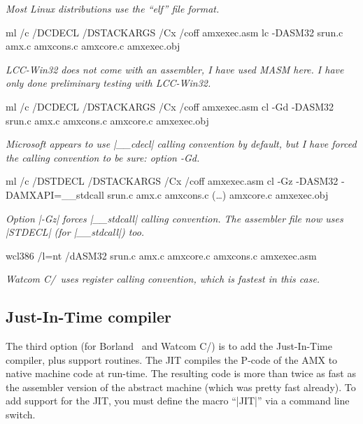         {\it Most Linux distributions use the ``elf'' file format.}

 \lbreak
        {\smalltt ml /c /DCDECL /DSTACKARGS /Cx /coff amxexec.asm} \lbreak
        {\smalltt lc -DASM32 srun.c amx.c amxcons.c amxcore.c amxexec.obj}

        {\it LCC-Win32 does not come with an assembler, I have used MASM here.
        I have only done preliminary testing with LCC-Win32.}

 \lbreak
        {\smalltt ml /c /DCDECL /DSTACKARGS /Cx /coff amxexec.asm} \lbreak
        {\smalltt cl -Gd -DASM32 srun.c amx.c amxcons.c amxcore.c amxexec.obj}

        {\it Microsoft appears to use |__cdecl| calling convention by default,
        but I have forced the calling convention to be sure: option -Gd.}

 \lbreak
        {\smalltt ml /c /DSTDECL /DSTACKARGS /Cx /coff amxexec.asm} \lbreak
        {\smalltt cl -Gz -DASM32 -DAMXAPI=__stdcall srun.c amx.c amxcons.c {\sevenit (\dots)}\lbreak{\sevenit (\dots)} amxcore.c amxexec.obj}

        {\it Option |-Gz| forces |__stdcall| calling convention. The assembler
        file now uses |STDECL| (for |__stdcall|) too.}

 \lbreak
        {\smalltt wcl386 /l=nt /dASM32 srun.c amx.c amxcore.c amxcons.c amxexec.asm}

        {\it Watcom C/\Cpp\ uses register calling convention, which is fastest
        in this case.}
\endlist

\subsection{Just-In-Time compiler}
The third option (for Borland \Cpp\ and Watcom C/\Cpp) is to add the Just-In-Time compiler, plus
support routines. The JIT compiles the P-code of the AMX to native machine
code at run-time. The resulting code is more than twice as fast as the
assembler version of the abstract machine (which was pretty fast already).
To add support for the JIT, you must define the macro ``|JIT|'' via a command
line switch.

